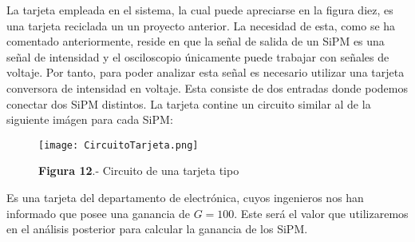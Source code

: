 La tarjeta empleada en el sistema, la cual puede apreciarse en la figura diez, es una tarjeta reciclada un un proyecto anterior. La necesidad de esta, como se ha comentado anteriormente, reside en que la señal de salida de un SiPM es una señal de intensidad y el osciloscopio únicamente puede trabajar con señales de voltaje. Por tanto, para poder analizar esta señal es necesario utilizar una tarjeta conversora de intensidad en voltaje. Esta consiste de dos entradas donde podemos conectar dos SiPM distintos. La tarjeta contine un circuito similar al de la siguiente imágen para cada SiPM:

\begin{figure}[hbtp]
\centering
\texttt{[image: CircuitoTarjeta.png]}
\caption{\textbf{Figura 12}.- Circuito de una tarjeta tipo}
\end{figure}


Es una tarjeta del departamento de electrónica, cuyos ingenieros nos han informado que posee una ganancia de $G=100$. Este será el valor que utilizaremos en el análisis posterior para calcular la ganancia de los SiPM.

